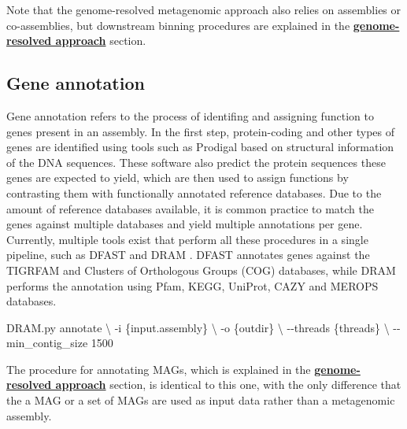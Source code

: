 \documentclass[
]{book}
\newenvironment{Shaded}{\begin{snugshade}}{\end{snugshade}}
\newcommand{\AttributeTok}[1]{\textcolor[rgb]{0.77,0.63,0.00}{#1}}
\newcommand{\DataTypeTok}[1]{\textcolor[rgb]{0.13,0.29,0.53}{#1}}
\newcommand{\ExtensionTok}[1]{#1}
\newcommand{\NormalTok}[1]{#1}
\begin{document}
\normalsize

Note that the genome-resolved metagenomic approach also relies on assemblies or co-assemblies, but downstream binning procedures are explained in the \textbf{\protect\hyperlink{genome-resolved}{genome-resolved approach}} section.

\hypertarget{assembly-gene-annotation}{%
\subsection*{Gene annotation}\label{assembly-gene-annotation}}

Gene annotation refers to the process of identifing and assigning function to genes present in an assembly. In the first step, protein-coding and other types of genes are identified using tools such as Prodigal based on structural information of the DNA sequences. These software also predict the protein sequences these genes are expected to yield, which are then used to assign functions by contrasting them with functionally annotated reference databases. Due to the amount of reference databases available, it is common practice to match the genes against multiple databases and yield multiple annotations per gene. Currently, multiple tools exist that perform all these procedures in a single pipeline, such as DFAST \citep{Tanizawa2017-uy} and DRAM \citep{Shaffer2020-kp}. DFAST annotates genes against the TIGRFAM and Clusters of Orthologous Groups (COG) databases, while DRAM performs the annotation using Pfam, KEGG, UniProt, CAZY and MEROPS databases.

\small

\begin{Shaded}
\begin{Highlighting}[]
\ExtensionTok{DRAM.py}\NormalTok{ annotate }\DataTypeTok{\textbackslash{}}
      \AttributeTok{{-}i}\NormalTok{ \{input.assembly\} }\DataTypeTok{\textbackslash{}}
      \AttributeTok{{-}o}\NormalTok{ \{outdir\} }\DataTypeTok{\textbackslash{}}
      \AttributeTok{{-}{-}threads}\NormalTok{ \{threads\} }\DataTypeTok{\textbackslash{}}
      \AttributeTok{{-}{-}min\_contig\_size}\NormalTok{ 1500}
\end{Highlighting}
\end{Shaded}

\normalsize

The procedure for annotating MAGs, which is explained in the \textbf{\protect\hyperlink{genome-resolved}{genome-resolved approach}} section, is identical to this one, with the only difference that the a MAG or a set of MAGs are used as input data rather than a metagenomic assembly.
\end{document}
